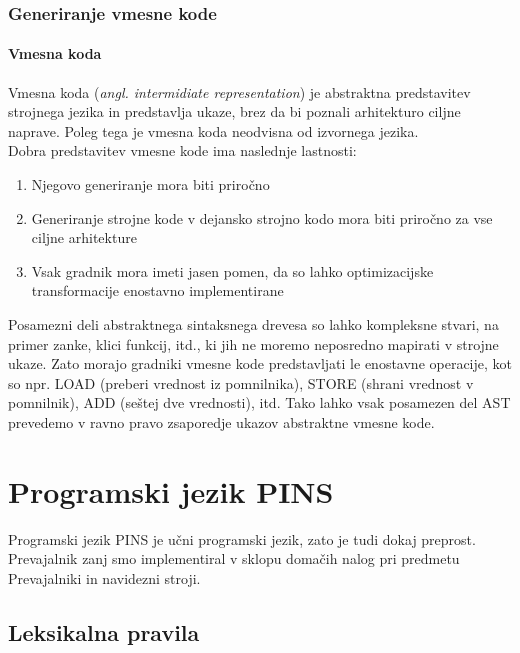 \documentclass[a4paper, 12pt]{book}
\begin{document}
\subsection{Generiranje vmesne kode}   

\subsubsection{Vmesna koda}

Vmesna koda (\textit{angl. intermidiate representation}) je abstraktna predstavitev strojnega jezika in predstavlja ukaze, brez da bi poznali arhitekturo ciljne naprave. Poleg tega je vmesna koda neodvisna od izvornega jezika. \cite{modernCompiler} \\
\indent Dobra predstavitev vmesne kode ima naslednje lastnosti:

\begin{enumerate}
	\item Njegovo generiranje mora biti priročno
	\item Generiranje strojne kode v dejansko strojno kodo mora biti priročno za vse ciljne arhitekture
	\item Vsak gradnik mora imeti jasen pomen, da so lahko optimizacijske transformacije enostavno implementirane
\end{enumerate}
\cite{modernCompiler}

Posamezni deli abstraktnega sintaksnega drevesa so lahko kompleksne stvari, na primer zanke, klici funkcij, itd., ki jih ne moremo neposredno mapirati v strojne ukaze. Zato morajo gradniki vmesne kode predstavljati le enostavne operacije, kot so npr. LOAD (preberi vrednost iz pomnilnika), STORE (shrani vrednost v pomnilnik), ADD (seštej dve vrednosti), itd. Tako lahko vsak posamezen del AST prevedemo v ravno pravo zsaporedje ukazov abstraktne vmesne kode. \cite{modernCompiler} \\ 

\chapter{Programski jezik PINS}

Programski jezik PINS je učni programski jezik, zato je tudi dokaj preprost. Prevajalnik zanj smo implementiral v sklopu domačih nalog pri predmetu Prevajalniki in navidezni stroji.

\section{Leksikalna pravila}
\end{document}
